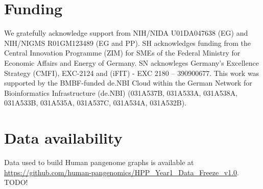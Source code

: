 \documentclass{bioinfo}
\begin{document}
\section*{Funding}

We gratefully acknowledge support from NIH/NIDA U01DA047638 (EG) and NIH/NIGMS R01GM123489 (EG and PP).
SH acknowledges funding from the Central Innovation Programme (ZIM) for SMEs of the Federal Ministry for Economic Affairs and Energy of Germany. SN acknowleges Germany’s Excellence Strategy (CMFI), EXC-2124 and (iFIT) - EXC 2180 – 390900677.
This work was supported by the BMBF-funded de.NBI Cloud within the German Network for Bioinformatics Infrastructure (de.NBI) (031A537B, 031A533A, 031A538A, 031A533B, 031A535A, 031A537C, 031A534A, 031A532B).

\section*{Data availability}

Data used to build Human pangenome graphs is available at \url{https://github.com/human-pangenomics/HPP_Year1_Data_Freeze_v1.0}.
TODO!


%
%
%
%
%
%
%











\end{document}

